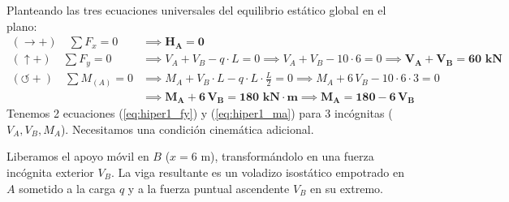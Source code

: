 {\begin{center}
{%
        }
    \end{center}

    Planteando las tres ecuaciones universales del equilibrio estático global en el plano:
    \begin{align}
        (\rightarrow +) \quad \sum F_x = 0             & \implies \mathbf{H_A = 0}                                                                                                                    \\
        (\uparrow +) \quad \sum F_y = 0                & \implies V_A + V_B - q \cdot L = 0 \implies V_A + V_B - 10 \cdot 6 = 0 \implies \mathbf{V_A + V_B = 60\text{ kN}} \label{eq:hiper1_fy}      \\
        (\circlearrowleft +) \quad \sum M_{(A)} = 0    & \implies M_A + V_B \cdot L - q \cdot L \cdot \frac{L}{2} = 0 \implies M_A + 6\,V_B - 10 \cdot 6 \cdot 3 = 0 \nonumber                      \\
                                                       & \implies \mathbf{M_A + 6\,V_B = 180\text{ kN}\cdot\text{m}} \implies \mathbf{M_A = 180 - 6\,V_B} \label{eq:hiper1_ma}
    \end{align}
    Tenemos 2 ecuaciones (\ref{eq:hiper1_fy}) y (\ref{eq:hiper1_ma}) para 3 incógnitas ($V_A, V_B, M_A$). Necesitamos una condición cinemática adicional.


    Liberamos el apoyo móvil en $B$ ($x = 6\text{ m}$), transformándolo en una fuerza incógnita exterior $V_B$. La viga resultante es un voladizo isostático empotrado en $A$ sometido a la carga $q$ y a la fuerza puntual ascendente $V_B$ en su extremo.

}
